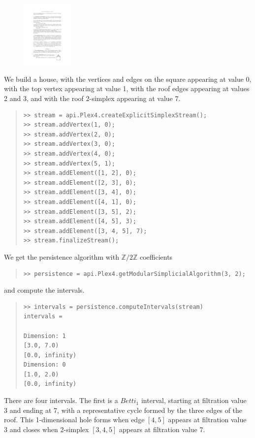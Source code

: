 \documentclass[amscd, amssymb, verbatim]{amsart}[12pt]
\theoremstyle{remark}
\theoremstyle{remark}
\theoremstyle{remark}
\newcommand{\Z}{\mathbb{Z}}
\begin{document}
\begin{figure}
	\begin{center}
   	\includegraphics[width=1in]{houseFig.pdf}
  	\end{center}
\end{figure}

We build a house, with the vertices and edges on the square appearing at value 0, with the top vertex appearing at value 1, with the roof edges appearing at values 2 and 3, and with the roof 2-simplex appearing at value 7.

\begin{quote} \begin{verbatim}
>> stream = api.Plex4.createExplicitSimplexStream();
>> stream.addVertex(1, 0);
>> stream.addVertex(2, 0);
>> stream.addVertex(3, 0);
>> stream.addVertex(4, 0);
>> stream.addVertex(5, 1);
>> stream.addElement([1, 2], 0);
>> stream.addElement([2, 3], 0);
>> stream.addElement([3, 4], 0);
>> stream.addElement([4, 1], 0);
>> stream.addElement([3, 5], 2);
>> stream.addElement([4, 5], 3);
>> stream.addElement([3, 4, 5], 7);
>> stream.finalizeStream();
\end{verbatim} \end{quote}

We get the persistence algorithm with $\Z/2\Z$ coefficients
\begin{quote} \begin{verbatim}
>> persistence = api.Plex4.getModularSimplicialAlgorithm(3, 2);
\end{verbatim} \end{quote}

and compute the intervals.

\begin{quote} \begin{verbatim}
>> intervals = persistence.computeIntervals(stream)
intervals =

Dimension: 1
[3.0, 7.0)
[0.0, infinity)
Dimension: 0
[1.0, 2.0)
[0.0, infinity)
\end{verbatim} \end{quote}

There are four intervals. The first is a $Betti_1$ interval, starting at filtration value 3 and ending at 7, with a representative cycle formed by the three edges of the roof. This 1-dimensional hole forms when edge $[4,5]$ appears at filtration value 3 and closes when 2-simplex $[3,4,5]$ appears at filtration value 7.
\end{document}
